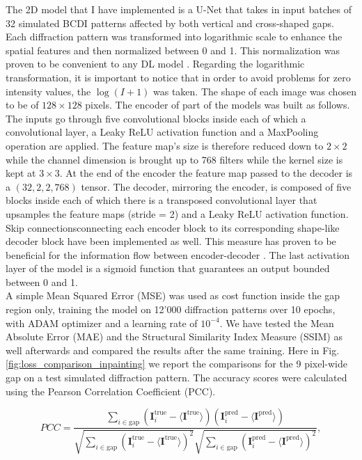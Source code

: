 The 2D model that I have implemented is a U-Net that takes in input batches of 32 simulated BCDI patterns affected 
by both vertical and cross-shaped gaps. Each diffraction pattern was transformed into logarithmic scale to enhance the 
spatial features and then normalized between 0 and 1. This normalization was proven to be convenient to any DL model \cite{efficientBackProp}.
Regarding the logarithmic transformation, it is important to notice that in order to avoid problems for zero intensity
values, the $\log(I+1)$ was taken.
The shape of each image was chosen to be of $128\times128$ pixels. The encoder of part of the models was built as follows. 
The inputs go through five convolutional blocks 
inside each of which a convolutional layer, a Leaky ReLU activation function and a MaxPooling operation are applied. 
The feature map's size is therefore reduced down to $2\times2$ while the channel dimension is brought up to 768 filters 
while the kernel size is kept at $3\times3$. At the end of the encoder the feature map passed to the decoder is a 
$(32,2,2,768)$ tensor.
The decoder, mirroring the encoder, is composed of five blocks inside each of which there is a transposed convolutional layer
that upsamples the feature maps (stride = 2) and a Leaky ReLU activation function. Skip connectionsconnecting each encoder block
to its corresponding shape-like decoder block have been implemented as well. This measure has proven to be beneficial 
for the information flow between encoder-decoder \cite{li_visualizing_2017}. The last activation layer of the model is 
a sigmoid function that guarantees an output bounded between 0 and 1. \\ 

A simple Mean Squared Error (MSE) was used as cost function inside the gap region only, training 
the model on 12'000 diffraction patterns over 10 epochs, with ADAM optimizer and a learning rate of $10^{-4}$. 
We have tested the Mean Absolute Error (MAE) and the Structural Similarity Index Measure (SSIM) \cite{ssim}
as well afterwards and compared the results after the same training.
Here in Fig. \ref{fig:loss_comparison_inpainting} we report the comparisons for the 9 pixel-wide gap on a test simulated diffraction
pattern. The accuracy scores were calculated using the Pearson Correlation Coefficient (PCC).

\begin{equation}
    PCC = \frac{\sum_{i\in \text{gap}}(\textbf{I}_i^{\text{true}} - 
    \langle \textbf{I}^{\text{true}}\rangle)(\textbf{I}_i^{\text{pred}}-
    \langle\textbf{I}^{\text{pred}}\rangle)}{\sqrt{\sum_{i\in \text{gap}}^{}(\textbf{I}_i^{\text{true}} - 
    \langle \textbf{I}^{\text{true}}\rangle)^2}\sqrt{\sum_{i\in \text{gap}}^{}(\textbf{I}_i^{\text{pred}}-
    \langle\textbf{I}^{\text{pred}}\rangle)^2}},
        \label{eq:accuracy}
\end{equation}

